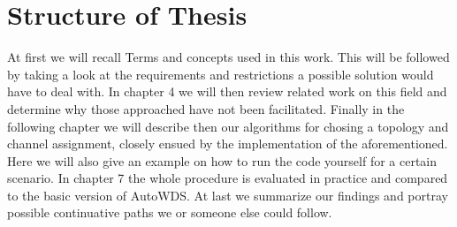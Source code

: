 \section{Structure of Thesis}
  At first we will recall Terms and concepts used in this work. 
  This will be followed by taking a look at the requirements and restrictions a possible solution would have to deal with.
  In chapter 4 we will then review related work on this field and determine why those approached have not been facilitated.
  Finally in the following chapter we will describe then our algorithms for chosing a topology and channel assignment, closely ensued by the implementation of 
  the aforementioned. Here we will also give an example on how to run the code yourself for a certain scenario.
  In chapter 7 the whole procedure is evaluated in practice and compared to the basic version of AutoWDS.
  At last we summarize our findings and portray possible continuative paths we or someone else could follow.
